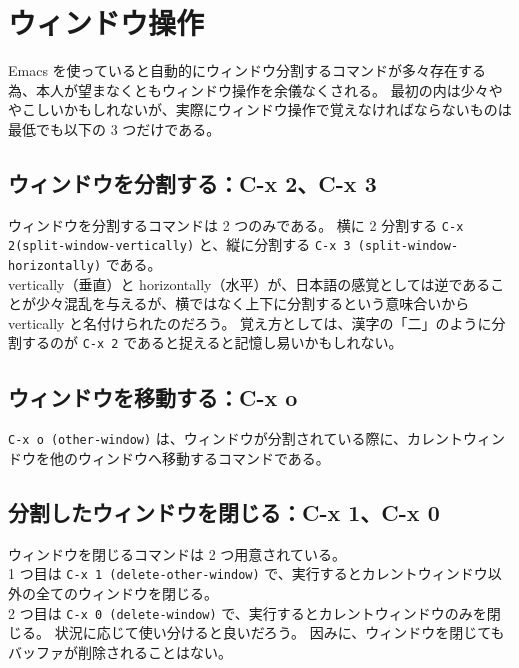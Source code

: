 \section{ウィンドウ操作}
Emacs を使っていると自動的にウィンドウ分割するコマンドが多々存在する為、本人が望まなくともウィンドウ操作を余儀なくされる。
最初の内は少々ややこしいかもしれないが、実際にウィンドウ操作で覚えなければならないものは最低でも以下の 3 つだけである。
\subsection{ウィンドウを分割する：C-x 2、C-x 3}
ウィンドウを分割するコマンドは 2 つのみである。
横に 2 分割する \texttt{C-x 2(split-window-vertically)} と、縦に分割する \texttt{C-x 3 (split-window-horizontally)} である。\\

vertically（垂直）と horizontally（水平）が、日本語の感覚としては逆であることが少々混乱を与えるが、横ではなく上下に分割するという意味合いから vertically と名付けられたのだろう。
覚え方としては、漢字の「二」のように分割するのが \texttt{C-x 2} であると捉えると記憶し易いかもしれない。
\subsection{ウィンドウを移動する：C-x o}
\texttt{C-x o (other-window)} は、ウィンドウが分割されている際に、カレントウィンドウを他のウィンドウへ移動するコマンドである。
\subsection{分割したウィンドウを閉じる：C-x 1、C-x 0}
ウィンドウを閉じるコマンドは 2 つ用意されている。\\

1 つ目は \texttt{C-x 1 (delete-other-window)} で、実行するとカレントウィンドウ以外の全てのウィンドウを閉じる。\\

2 つ目は \texttt{C-x 0 (delete-window)} で、実行するとカレントウィンドウのみを閉じる。
状況に応じて使い分けると良いだろう。
因みに、ウィンドウを閉じてもバッファが削除されることはない。
